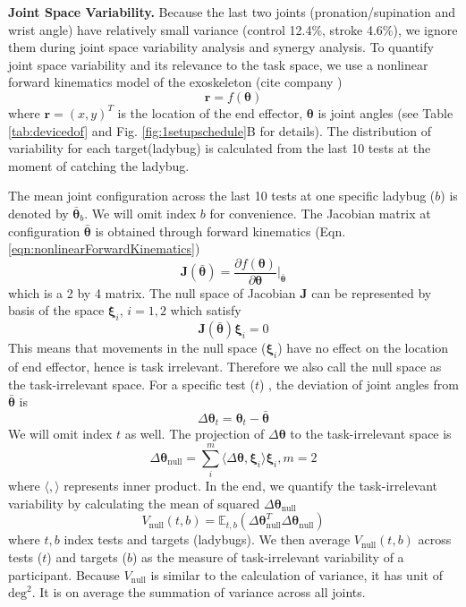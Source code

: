\textbf{Joint Space Variability.}
Because the last two joints (pronation/supination and wrist angle) have relatively small variance (control 12.4\%, stroke 4.6\%), we ignore them during joint space variability analysis and synergy analysis.
To quantify joint space variability and its relevance to the task space, we use a nonlinear forward kinematics model of the exoskeleton (cite company \cite{})
	\begin{equation}\label{eqn:nonlinearForwardKinematics}
	\bm{r} = f(\bm{\theta})
	\end{equation}
where $ \bm{r} = (x,y)^T $ is the location of the end effector, $ \bm{\theta} $ is joint angles (see Table \ref{tab:devicedof} and Fig. \ref{fig:1setupschedule}B for details). 
The distribution of variability for each target(ladybug) is calculated from the last 10 tests at the moment of catching the ladybug. 

The mean joint configuration across the last 10 tests at one specific ladybug ($ b $) is denoted by $ \bar{\bm{\theta}}_b $.
We will omit index $ b $ for convenience.
The Jacobian matrix at configuration $ \bar{\bm{\theta}} $ is obtained through forward kinematics (Eqn. \ref{eqn:nonlinearForwardKinematics})
	\begin{equation}
	\bm{J}(\bar{\bm{\theta}}) = \frac{\partial f(\bm{\theta})}{\partial \bm{\theta}} \Big\rvert_{\bar{\bm{\theta}}}
	\end{equation}
which is a 2 by 4 matrix.
The null space of Jacobian $ \bm{J} $ can be represented by basis of the space $ \bm{\xi}_i $, $ i= 1,2 $ which satisfy
	\begin{equation}
	\bm{J}(\bar{\bm{\theta}}) \bm{\xi}_i = 0
	\end{equation}
This means that movements in the null space ($ \bm{\xi}_i $) have no effect on the location of end effector, hence is task irrelevant.
Therefore we also call the null space as the task-irrelevant space.
For a specific test ($ t $) , the deviation of joint angles from $ \bar{\bm{\theta}} $ is
	\begin{equation}
	\Delta\bm{\theta}_t = \bm{\theta}_t - \bar{\bm{\theta}}
	\end{equation}
We will omit index $ t $ as well.
The projection of $ \Delta\bm{\theta} $ to the task-irrelevant space is
	\begin{equation}
	\Delta\bm{\theta}_{\text{null}} = \sum_i^m \langle \Delta\bm{\theta}, \bm{\xi}_i \rangle \bm{\xi}_i, m=2
	\end{equation}
where $ \langle,\rangle $ represents inner product.
In the end, we quantify the task-irrelevant variability by calculating the mean of squared $ \Delta\bm{\theta}_{\text{null}} $
	\begin{equation}\label{eqn:nullvar}
	V_{\text{null}}(t,b) = \mathbb{E}_{t,b} (\Delta\bm{\theta}_{\text{null}}^T\Delta\bm{\theta}_{\text{null}})
	\end{equation}
where $ t,b $ index tests and targets (ladybugs). 
We then average $ V_{\text{null}}(t,b) $ across tests ($ t $) and targets ($ b $) as the measure of task-irrelevant variability of a participant. 
Because $ V_{\text{null}} $ is similar to the calculation of variance, it has unit of $ \text{deg}^2 $.
It is on average the summation of variance across all joints.


